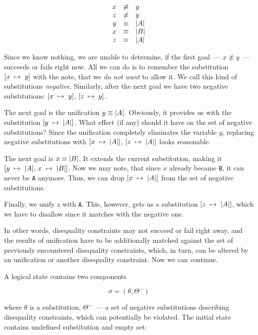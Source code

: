 $$
\def\arraystretch{1}
\begin{array}{rcl}
x&\not\equiv&y\\
z&\not\equiv&y\\
y&\equiv&\lstinline|A|\\
x&\equiv&\lstinline|B|\\
z&\equiv&\lstinline|A|
\end{array}
$$

Since we know nothing, we are unable to determine, if the first goal~--- \mbox{$x\not\equiv y$}~--- succeeds or fails right now. All we can do is to
remember the substitution \mbox{$[x\;\mapsto\; y]$} with the note, that we \emph{do not want} to allow it. We call this kind of substitutions \emph{negative}. Similarly,
after the next goal we have two negative substitutions: \mbox{$[x\;\mapsto\; y]$}, \mbox{$[z\;\mapsto\; y]$}. 

The next goal is the unification \mbox{$y\equiv\lstinline|A|$}. Obviously, it provides us with the substitution \mbox{$[y\binds\lstinline|A|]$}. What effect (if any)
should it have on the set of negative substitutions? Since the unification completely eliminates the variable $y$, replacing negative substitutions with
\mbox{$[x\binds\lstinline|A|]$}, \mbox{$[z\binds\lstinline|A|]$} looks reasonable.

The next goal is \mbox{$x\equiv\lstinline|B|$}. It extends the current substitution, making it \mbox{$[y\binds\lstinline|A|,\,x\binds\lstinline|B|]$}. Now we may
note, that since $x$ already became \lstinline|B|, it can never be \lstinline|A| anymore. Thus, we can drop \mbox{$[x\binds\lstinline|A|]$} from the set of
negative substitutions.

Finally, we unify $z$ with \lstinline|A|. This, however, gets us a substitution \mbox{$[z\binds\lstinline|A|]$}, which we have to disallow since it
matches with the negative one.

In other words, disequality constraints may not succeed or fail right away, and the results of unification have to be additionally matched against the set of 
previously encountered disequality constraints, which, in turn, can be altered by an unification or another disequality constraint. Now we can continue.

A logical state contains two components

$$
\sigma=(\theta,\Theta^-)
$$

\noindent where $\theta$ is a substitution, $\Theta^-$~--- a set of negative substitutions describing disequality constraints, 
which can potentially be violated. The initial state contains undefined substitution and empty set:

